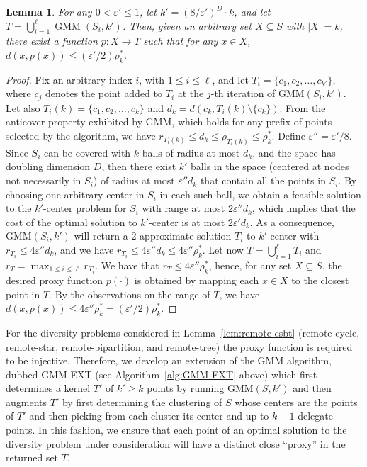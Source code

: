 \documentclass{article}
\newtheorem{lemma}{Lemma}
\renewcommand{\epsilon}{\varepsilon}
\begin{document}
\begin{lemma}\label{lem:gmm-properties}
  For any $0 < \epsilon' \leq 1$, let $k'=(8/\epsilon')^D\cdot k$, and
  let $T=\bigcup_{i=1}^\ell \operatorname{GMM}(S_i, k')$. Then, given
  an arbitrary set $X\subseteq S$ with $|X| = k$, there exist a
  function $p: X \rightarrow T$ such that for any $x\in X$,
  $d(x, p(x)) \le (\epsilon'/2)\rho_k^*$.
\end{lemma}
\begin{proof}
  Fix an arbitrary index $i$, with $1 \leq i \leq \ell$, and let
  $T_i=\{ c_1, c_2, \ldots, c_{k'}\}$, where $c_j$ denotes the point
  added to $T_i$ at the $j$-th iteration of {\sc GMM}$(S_i, k')$. Let
  also $T_i(k)=\{c_1, c_2, \ldots, c_k\}$ and
  $d_k = d(c_k, T_i(k)\setminus \{c_k\})$. From the anticover property
  exhibited by GMM, which holds for any prefix of points selected by
  the algorithm, we have
  $r_{T_i(k)} \le d_k\le \rho_{T_i(k)} \le \rho_k^*$.  Define
  $\epsilon''=\epsilon'/8$. Since $S_i$ can be covered with $k$ balls
  of radius at most $d_k$, and the space has doubling dimension $D$,
  then there exist $k'$ balls in the space (centered at nodes not
  necessarily in $S_i$) of radius at most $\epsilon'' d_k$ that
  contain all the points in $S_i$. By choosing one arbitrary center in
  $S_i$ in each such ball, we obtain a feasible solution to the
  $k'$-center problem for $S_i$ with range at most $2\epsilon'' d_k$,
  which implies that the cost of the optimal solution to $k'$-center
  is at most $2\epsilon' d_k$. As a consequence, {\sc GMM}$(S_i, k')$
  will return a 2-approximate solution $T_i$ to $k'$-center with
  $r_{T_i} \le 4\epsilon'' d_k$, and we have
  $r_{T_i} \le 4\epsilon'' d_k \le 4\epsilon''\rho_k^*$. Let now
  $T=\bigcup_{i=1}^\ell T_i$ and $r_T=\max_{1\le i\le\ell}
  r_{T_i}$. We have that $r_T\le 4\epsilon''\rho_k^*$, hence, for any
  set $X\subseteq S$, the desired proxy function $p(\cdot)$ is
  obtained by mapping each $x\in X$ to the closest point in $T$. By
  the observations on the range of $T$, we have
  $d(x, p(x)) \le 4\epsilon''\rho_k^* = (\epsilon'/2)\rho_k^*$.
\end{proof}

For the diversity problems considered in Lemma~\ref{lem:remote-csbt}
(remote-cycle, remote-star, remote-bipartition, and remote-tree) the
proxy function is required to be injective. Therefore, we develop an
extension of the {\sc GMM} algorithm, dubbed {\sc GMM-EXT} (see
Algorithm~\ref{alg:GMM-EXT} above) which first determines a kernel
$T'$ of $k'\geq k$ points by running {\sc GMM}$(S,k')$ and then
augments $T'$ by first determining the clustering of $S$ whose centers
are the points of $T'$ and then picking from each cluster its center
and up to $k-1$ delegate points.  In this fashion, we ensure that each
point of an optimal solution to the diversity problem under
consideration will have a distinct close ``proxy'' in the returned set
$T$.
\end{document}
